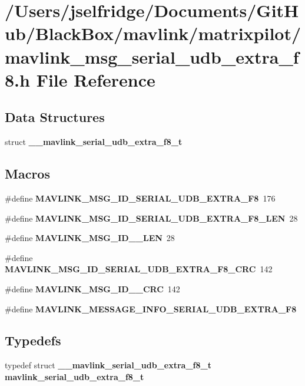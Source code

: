 \section{/\+Users/jselfridge/\+Documents/\+Git\+Hub/\+Black\+Box/mavlink/matrixpilot/mavlink\+\_\+msg\+\_\+serial\+\_\+udb\+\_\+extra\+\_\+f8.h File Reference}
\label{mavlink__msg__serial__udb__extra__f8_8h}
\subsection*{Data Structures}
\begin{DoxyCompactItemize}
\item 
struct \textbf{ \+\_\+\+\_\+mavlink\+\_\+serial\+\_\+udb\+\_\+extra\+\_\+f8\+\_\+t}
\end{DoxyCompactItemize}
\subsection*{Macros}
\begin{DoxyCompactItemize}
\item 
\#define \textbf{ M\+A\+V\+L\+I\+N\+K\+\_\+\+M\+S\+G\+\_\+\+I\+D\+\_\+\+S\+E\+R\+I\+A\+L\+\_\+\+U\+D\+B\+\_\+\+E\+X\+T\+R\+A\+\_\+\+F8}~176
\item 
\#define \textbf{ M\+A\+V\+L\+I\+N\+K\+\_\+\+M\+S\+G\+\_\+\+I\+D\+\_\+\+S\+E\+R\+I\+A\+L\+\_\+\+U\+D\+B\+\_\+\+E\+X\+T\+R\+A\+\_\+\+F8\+\_\+\+L\+EN}~28
\item 
\#define \textbf{ M\+A\+V\+L\+I\+N\+K\+\_\+\+M\+S\+G\+\_\+\+I\+D\+\_\+\_\+\+L\+EN}~28
\item 
\#define \textbf{ M\+A\+V\+L\+I\+N\+K\+\_\+\+M\+S\+G\+\_\+\+I\+D\+\_\+\+S\+E\+R\+I\+A\+L\+\_\+\+U\+D\+B\+\_\+\+E\+X\+T\+R\+A\+\_\+\+F8\+\_\+\+C\+RC}~142
\item 
\#define \textbf{ M\+A\+V\+L\+I\+N\+K\+\_\+\+M\+S\+G\+\_\+\+I\+D\+\_\+\_\+\+C\+RC}~142
\item 
\#define \textbf{ M\+A\+V\+L\+I\+N\+K\+\_\+\+M\+E\+S\+S\+A\+G\+E\+\_\+\+I\+N\+F\+O\+\_\+\+S\+E\+R\+I\+A\+L\+\_\+\+U\+D\+B\+\_\+\+E\+X\+T\+R\+A\+\_\+\+F8}
\end{DoxyCompactItemize}
\subsection*{Typedefs}
\begin{DoxyCompactItemize}
\item 
typedef struct \textbf{ \+\_\+\+\_\+mavlink\+\_\+serial\+\_\+udb\+\_\+extra\+\_\+f8\+\_\+t} \textbf{ mavlink\+\_\+serial\+\_\+udb\+\_\+extra\+\_\+f8\+\_\+t}
\end{DoxyCompactItemize}


